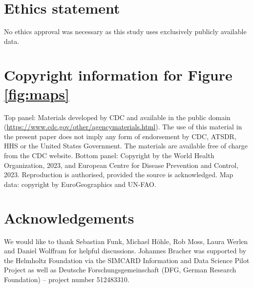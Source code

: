 \documentclass[12pt]{article}
\begin{document}
\section*{Ethics statement}

No ethics approval was necessary as this study uses exclusively publicly available data.

\section*{Copyright information for Figure \ref{fig:maps}}

Top panel: Materials developed by CDC and available in the public domain (\url{https://www.cdc.gov/other/agencymaterials.html}). The use of this material in the present paper does not imply any form of endorsement by CDC, ATSDR, HHS or the United States Government. The materials are available free of charge from the CDC website. Bottom panel: Copyright by the World Health Organization, 2023, and European Centre for Disease Prevention and Control, 2023. Reproduction is authorised, provided the source is acknowledged. Map data: copyright by EuroGeographics and UN-FAO. 




\section*{Acknowledgements}

We would like to thank Sebastian Funk, Michael H\"ohle, Rob Moss, Laura Werlen and Daniel Wolffram for helpful discussions. Johannes Bracher was supported by the Helmholtz Foundation via the SIMCARD Information and Data Science Pilot Project as well as Deutsche Forschungsgemeinschaft (DFG, German Research Foundation) -- project number 512483310.

{\footnotesize


}

\newpage
\appendix


\renewcommand{\thepage}{S\arabic{page}}
\renewcommand{\thesection}{S\arabic{section}}
\renewcommand{\thetable}{S\arabic{table}}
\renewcommand{\thefigure}{S\arabic{figure}}
\setcounter{page}{1}
\setcounter{section}{0}
\setcounter{table}{0}
\setcounter{figure}{0}
\end{document}
